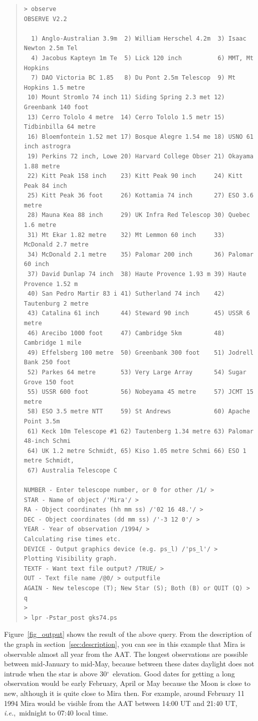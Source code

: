 \documentclass[11pt]{article}
\newcommand{\degrees}{\hbox{$^\circ$}}
\newcommand{\degrees}{{\rawhtml &deg;}}
\begin{document}
\begin{quote}\small
\begin{verbatim}
> observe
OBSERVE V2.2

  1) Anglo-Australian 3.9m  2) William Herschel 4.2m  3) Isaac Newton 2.5m Tel
  4) Jacobus Kapteyn 1m Te  5) Lick 120 inch          6) MMT, Mt Hopkins
  7) DAO Victoria BC 1.85   8) Du Pont 2.5m Telescop  9) Mt Hopkins 1.5 metre
 10) Mount Stromlo 74 inch 11) Siding Spring 2.3 met 12) Greenbank 140 foot
 13) Cerro Tololo 4 metre  14) Cerro Tololo 1.5 metr 15) Tidbinbilla 64 metre
 16) Bloemfontein 1.52 met 17) Bosque Alegre 1.54 me 18) USNO 61 inch astrogra
 19) Perkins 72 inch, Lowe 20) Harvard College Obser 21) Okayama 1.88 metre
 22) Kitt Peak 158 inch    23) Kitt Peak 90 inch     24) Kitt Peak 84 inch
 25) Kitt Peak 36 foot     26) Kottamia 74 inch      27) ESO 3.6 metre
 28) Mauna Kea 88 inch     29) UK Infra Red Telescop 30) Quebec 1.6 metre
 31) Mt Ekar 1.82 metre    32) Mt Lemmon 60 inch     33) McDonald 2.7 metre
 34) McDonald 2.1 metre    35) Palomar 200 inch      36) Palomar 60 inch
 37) David Dunlap 74 inch  38) Haute Provence 1.93 m 39) Haute Provence 1.52 m
 40) San Pedro Martir 83 i 41) Sutherland 74 inch    42) Tautenburg 2 metre
 43) Catalina 61 inch      44) Steward 90 inch       45) USSR 6 metre
 46) Arecibo 1000 foot     47) Cambridge 5km         48) Cambridge 1 mile
 49) Effelsberg 100 metre  50) Greenbank 300 foot    51) Jodrell Bank 250 foot
 52) Parkes 64 metre       53) Very Large Array      54) Sugar Grove 150 foot
 55) USSR 600 foot         56) Nobeyama 45 metre     57) JCMT 15 metre
 58) ESO 3.5 metre NTT     59) St Andrews            60) Apache Point 3.5m
 61) Keck 10m Telescope #1 62) Tautenberg 1.34 metre 63) Palomar 48-inch Schmi
 64) UK 1.2 metre Schmidt, 65) Kiso 1.05 metre Schmi 66) ESO 1 metre Schmidt,
 67) Australia Telescope C

NUMBER - Enter telescope number, or 0 for other /1/ >
STAR - Name of object /'Mira'/ >
RA - Object coordinates (hh mm ss) /'02 16 48.'/ >
DEC - Object coordinates (dd mm ss) /'-3 12 0'/ >
YEAR - Year of observation /1994/ >
Calculating rise times etc.
DEVICE - Output graphics device (e.g. ps_l) /'ps_l'/ >
Plotting Visibility graph.
TEXTF - Want text file output? /TRUE/ >
OUT - Text file name /@0/ > outputfile
AGAIN - New telescope (T); New Star (S); Both (B) or QUIT (Q) > q
>
> lpr -Pstar_post gks74.ps
\end{verbatim}
\end{quote}

Figure~\ref{fig_output} shows the result of the above query.
From the description of the graph in section~\ref{sec:description},
you can see in this example that Mira is observable almost all year
from the AAT.  The longest observations are possible between
mid-January to mid-May, because  between these dates daylight does not
intrude when the star is above 30\degrees\ elevation. Good dates for
getting a long observation would be early February, April or May
because the Moon is close to new, although it is quite close to Mira
then.  For example, around February 11 1994 Mira would be visible from
the AAT between 14:00 UT and 21:40 UT, {\em{i.e.}},~midnight to 07:40
local time.
\end{document}
